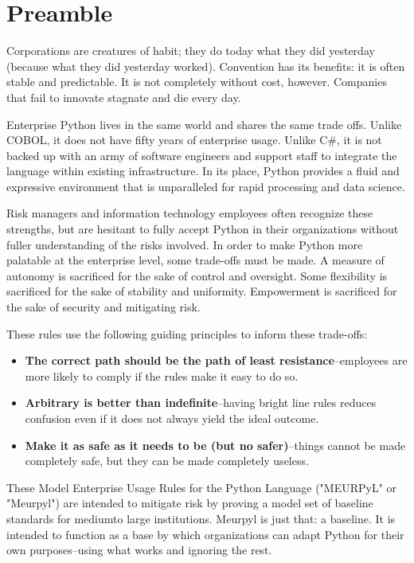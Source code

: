 \section*{Preamble}
\thispagestyle{preamble_style}

Corporations are creatures of habit; they do today what they did yesterday (because what they did yesterday worked). Convention has its benefits: it is often stable and predictable. It is not completely without cost, however. Companies that fail to innovate stagnate and die every day.

Enterprise Python lives in the same world and shares the same trade offs. Unlike COBOL, it does not have fifty years of enterprise usage. Unlike C\#, it is not backed up with an army of software engineers and support staff to integrate the language within existing infrastructure. In its place, Python provides a fluid and expressive environment that is unparalleled for rapid processing and data science.

Risk managers and information technology employees often recognize these strengths, but are hesitant to fully accept Python in their organizations without fuller understanding of the risks involved. In order to make Python more palatable at the enterprise level, some trade-offs must be made. A measure of autonomy is sacrificed for the sake of control and oversight. Some flexibility is sacrificed for the sake of stability and uniformity. Empowerment is sacrificed for the sake of security and mitigating risk. 

These rules use the following guiding principles to inform these trade-offs:

\begin{itemize}
	\item \textbf{The correct path should be the path of least resistance}--employees are more likely to comply if the rules make it easy to do so.
	\item \textbf{Arbitrary is better than indefinite}--having bright line rules reduces confusion even if it does not always yield the ideal outcome.
	\item \textbf{Make it as safe as it needs to be (but no safer)}--things cannot be made completely safe, but they can be made completely useless.
\end{itemize}

These Model Enterprise Usage Rules for the Python Language ("MEURPyL" or "Meurpyl") are intended to mitigate risk by proving a model set of baseline standards for mediumto large institutions. Meurpyl is just that: a baseline. It is intended to function as a base by which organizations can adapt Python for their own purposes--using what works and ignoring the rest.